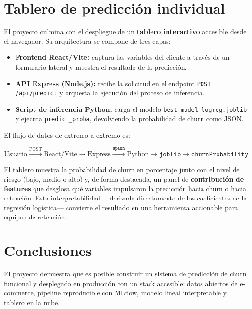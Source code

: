 \documentclass[11pt]{article}
\begin{document}
\section{Tablero de predicción individual}

El proyecto culmina con el despliegue de un \textbf{tablero interactivo} accesible desde el
navegador. Su arquitectura se compone de tres capas:

\begin{itemize}[leftmargin=1.5em]
  \item \textbf{Frontend React/Vite:} captura las variables del cliente a través de un
        formulario lateral y muestra el resultado de la predicción.
  \item \textbf{API Express (Node.js):} recibe la solicitud en el endpoint
        \texttt{POST /api/predict} y orquesta la ejecución del proceso de inferencia.
  \item \textbf{Script de inferencia Python:} carga el modelo \texttt{best\_model\_logreg.joblib}
        y ejecuta \texttt{predict\_proba}, devolviendo la probabilidad de churn como JSON.
\end{itemize}

El flujo de datos de extremo a extremo es:

\[
  \text{Usuario} \xrightarrow{\text{POST}} \text{React/Vite} \rightarrow \text{Express}
  \xrightarrow{\texttt{spawn}} \text{Python} \rightarrow \texttt{joblib} \rightarrow
  \texttt{churnProbability}
\]

El tablero muestra la probabilidad de churn en porcentaje junto con el nivel de riesgo
(bajo, medio o alto) y, de forma destacada, un panel de \textbf{contribución de features}
que desglosa qué variables impulsaron la predicción hacia churn o hacia retención. Esta
interpretabilidad —derivada directamente de los coeficientes de la regresión logística—
convierte el resultado en una herramienta accionable para equipos de retención.

\section{Conclusiones}

El proyecto demuestra que es posible construir un sistema de predicción de churn funcional
y desplegado en producción con un stack accesible: datos abiertos de e-commerce, pipeline
reproducible con MLflow, modelo lineal interpretable y tablero en la nube.
\end{document}
